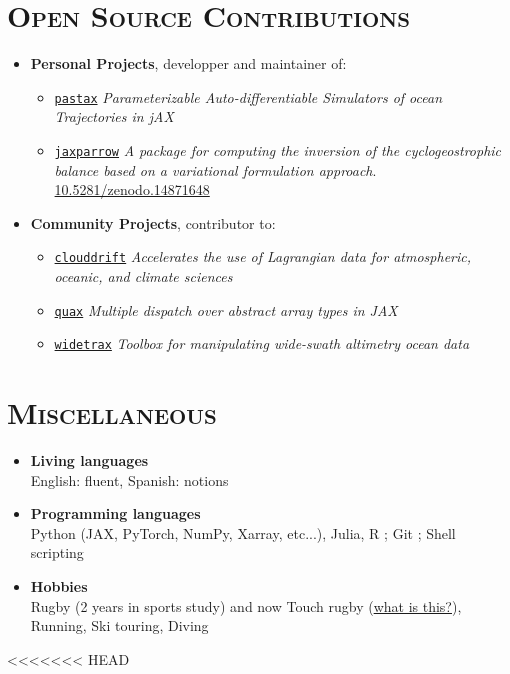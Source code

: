 \documentclass{article}
\begin{document}
\section*{\textsc{Open Source Contributions}}
\begin{itemize}
    \item[] \textbf{Personal Projects}, developper and maintainer of:
        \begin{itemize}[leftmargin=2cm]
            \item[] \href{https://github.com/vadmbertr/pastax}{\texttt{pastax}} \textit{Parameterizable Auto-differentiable Simulators of ocean Trajectories in jAX}
            \item[] \href{https://github.com/meom-group/jaxparrow}{\texttt{jaxparrow}} \textit{A package for computing the inversion of the cyclogeostrophic balance based on a variational formulation approach}. \href{https://doi.org/10.5281/zenodo.14871648}{10.5281/zenodo.14871648}
        \end{itemize}
    \item[] \textbf{Community Projects}, contributor to:
        \begin{itemize}[leftmargin=2cm]
            \item[] \href{https://github.com/Cloud-Drift/clouddrift}{\texttt{clouddrift}} \textit{Accelerates the use of Lagrangian data for atmospheric, oceanic, and climate sciences}
            \item[] \href{https://github.com/patrick-kidger/quax}{\texttt{quax}} \textit{Multiple dispatch over abstract array types in JAX}
            \item[] \href{https://github.com/meom-group/widetrax}{\texttt{widetrax}} \textit{Toolbox for manipulating wide-swath altimetry ocean data}
        \end{itemize}
\end{itemize}

\section*{\textsc{Miscellaneous}}
\begin{itemize}
    \item[] \textbf{Living languages} \\[.1 cm] 
        \tabto{2cm} English: fluent, Spanish: notions
    \item[] \textbf{Programming languages} \\[.1 cm] 
        \tabto{2cm} Python (JAX, PyTorch, NumPy, Xarray, etc...), Julia, R ; Git ; Shell scripting
    \item[] \textbf{Hobbies} \\[.1 cm] 
        \tabto{2cm} Rugby (2 years in sports study) and now Touch rugby (\href{https://youtu.be/yE_VXFf4pCk?si=aiIs_IFJW4eTuIwQ}{what is this?}), Running, Ski touring, Diving
\end{itemize}

<<<<<<< HEAD
\end{document}
